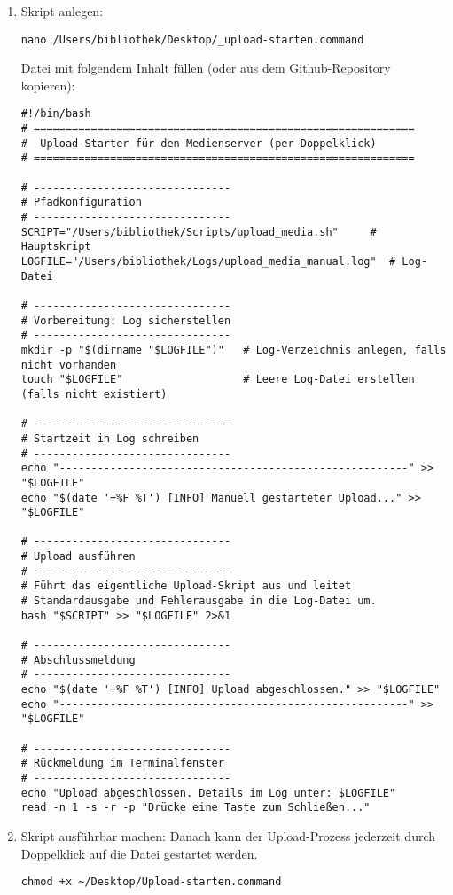 \documentclass[12pt,a4paper]{report}
\begin{document}
  \begin{enumerate}
    \item Skript anlegen:

    \begin{verbatim}
nano /Users/bibliothek/Desktop/_upload-starten.command
    \end{verbatim}

    Datei mit folgendem Inhalt füllen (oder aus dem Github-Repository kopieren):

    \begin{verbatim}
#!/bin/bash
# ============================================================
#  Upload-Starter für den Medienserver (per Doppelklick)
# ============================================================

# -------------------------------
# Pfadkonfiguration
# -------------------------------
SCRIPT="/Users/bibliothek/Scripts/upload_media.sh"     # Hauptskript
LOGFILE="/Users/bibliothek/Logs/upload_media_manual.log"  # Log-Datei

# -------------------------------
# Vorbereitung: Log sicherstellen
# -------------------------------
mkdir -p "$(dirname "$LOGFILE")"   # Log-Verzeichnis anlegen, falls nicht vorhanden
touch "$LOGFILE"                   # Leere Log-Datei erstellen (falls nicht existiert)

# -------------------------------
# Startzeit in Log schreiben
# -------------------------------
echo "-------------------------------------------------------" >> "$LOGFILE"
echo "$(date '+%F %T') [INFO] Manuell gestarteter Upload..." >> "$LOGFILE"

# -------------------------------
# Upload ausführen
# -------------------------------
# Führt das eigentliche Upload-Skript aus und leitet
# Standardausgabe und Fehlerausgabe in die Log-Datei um.
bash "$SCRIPT" >> "$LOGFILE" 2>&1

# -------------------------------
# Abschlussmeldung
# -------------------------------
echo "$(date '+%F %T') [INFO] Upload abgeschlossen." >> "$LOGFILE"
echo "-------------------------------------------------------" >> "$LOGFILE"

# -------------------------------
# Rückmeldung im Terminalfenster
# -------------------------------
echo "Upload abgeschlossen. Details im Log unter: $LOGFILE"
read -n 1 -s -r -p "Drücke eine Taste zum Schließen..."
    \end{verbatim}

    \item Skript ausführbar machen:
    Danach kann der Upload-Prozess jederzeit durch Doppelklick auf die Datei gestartet werden.

    \begin{verbatim}
chmod +x ~/Desktop/Upload-starten.command
    \end{verbatim}
  \end{enumerate}
\end{document}
